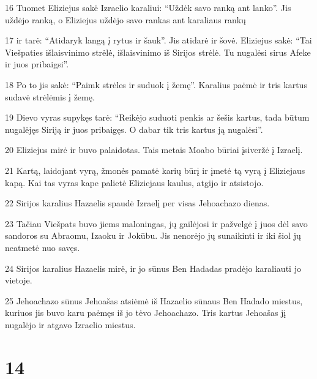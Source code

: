 \par 16 Tuomet Eliziejus sakė Izraelio karaliui: “Uždėk savo ranką ant lanko”. Jis uždėjo ranką, o Eliziejus uždėjo savo rankas ant karaliaus rankų 
\par 17 ir tarė: “Atidaryk langą į rytus ir šauk”. Jis atidarė ir šovė. Eliziejus sakė: “Tai Viešpaties išlaisvinimo strėlė, išlaisvinimo iš Sirijos strėlė. Tu nugalėsi sirus Afeke ir juos pribaigsi”. 
\par 18 Po to jis sakė: “Paimk strėles ir suduok į žemę”. Karalius paėmė ir tris kartus sudavė strėlėmis į žemę. 
\par 19 Dievo vyras supykęs tarė: “Reikėjo suduoti penkis ar šešis kartus, tada būtum nugalėjęs Siriją ir juos pribaigęs. O dabar tik tris kartus ją nugalėsi”. 
\par 20 Eliziejus mirė ir buvo palaidotas. Tais metais Moabo būriai įsiveržė į Izraelį. 
\par 21 Kartą, laidojant vyrą, žmonės pamatė karių būrį ir įmetė tą vyrą į Eliziejaus kapą. Kai tas vyras kape palietė Eliziejaus kaulus, atgijo ir atsistojo. 
\par 22 Sirijos karalius Hazaelis spaudė Izraelį per visas Jehoachazo dienas. 
\par 23 Tačiau Viešpats buvo jiems maloningas, jų gailėjosi ir pažvelgė į juos dėl savo sandoros su Abraomu, Izaoku ir Jokūbu. Jis nenorėjo jų sunaikinti ir iki šiol jų neatmetė nuo savęs. 
\par 24 Sirijos karalius Hazaelis mirė, ir jo sūnus Ben Hadadas pradėjo karaliauti jo vietoje. 
\par 25 Jehoachazo sūnus Jehoašas atsiėmė iš Hazaelio sūnaus Ben Hadado miestus, kuriuos jis buvo karu paėmęs iš jo tėvo Jehoachazo. Tris kartus Jehoašas jį nugalėjo ir atgavo Izraelio miestus.



\chapter{14}


